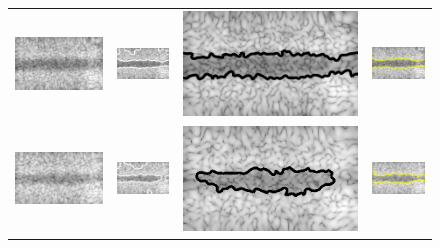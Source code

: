 \begin{figure}[t]
\centering
	\renewcommand{\tabcolsep}{0.05cm}
	\begin{tabular}{@{}cccc@{}}
		\includegraphics[width=.23\linewidth]{./images/DL2S/compare/cylNORM57_orig} &
		\includegraphics[width=.23\linewidth]{./images/DL2S/compare/cylNORM57_CV} &
		\includegraphics[width=.23\linewidth]{./images/DL2S/compare/cylNORM57_L2S_p2_c} &
		\includegraphics[width=.23\linewidth]{./images/DL2S/compare/cylNORM57_DL} 
		\\
		\includegraphics[width=.23\linewidth]{./images/DL2S/compare/cylNORM59_orig} &
		\includegraphics[width=.23\linewidth]{./images/DL2S/compare/cylNORM59_CV} &
		\includegraphics[width=.23\linewidth]{./images/DL2S/compare/cylNORM59_L2S_p2_c} &
		\includegraphics[width=.23\linewidth]{./images/DL2S/compare/cylNORM59_DL} 

\end{tabular}
\end{figure}
